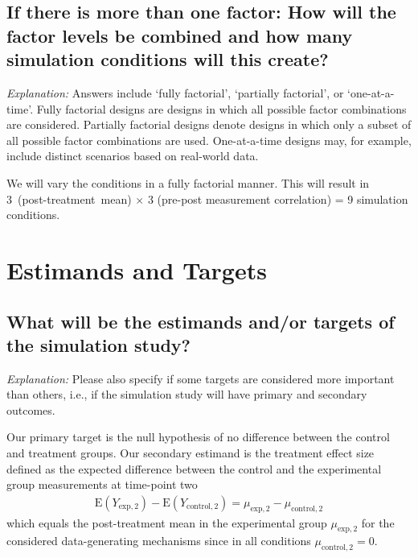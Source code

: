 \documentclass[12pt]{article}
\begin{document}
\subsection{If there is more than one factor: How will the factor levels be combined and how many simulation conditions will this create?} 
\textit{Explanation:}  Answers include `fully factorial', `partially factorial', or `one-at-a-time'. Fully factorial designs are designs in which all possible factor combinations are considered. Partially factorial designs denote designs in which only a subset of all possible factor combinations are used. One-at-a-time designs may, for example, include distinct scenarios based on real-world data. 
    
\begin{examplebox}
We will vary the conditions in a fully factorial manner. This will result in \mbox{3 (post-treatment mean)} $\times$ 3 (pre-post measurement correlation) = 9 simulation conditions.
\end{examplebox} 


\section{Estimands and Targets}
\subsection{What will be the estimands and/or targets of the simulation study?}      
\textit{Explanation:} Please also specify if some targets are considered more important than others, i.e., if the simulation study will have primary and secondary outcomes. 
    
\begin{examplebox}
Our primary target is the null hypothesis of no difference between the control and treatment groups. Our secondary estimand is the treatment effect size defined as the expected difference between the control and the experimental group measurements at time-point two
\begin{align*}
    \text{E}(Y_{\text{exp},2}) - \text{E}(Y_{\text{control},2}) = \mu_{\text{exp},2} - \mu_{\text{control},2}
\end{align*}
which equals the post-treatment mean in the experimental group $\mu_{\text{exp},2}$ for the considered data-generating mechanisms since in all conditions $\mu_{\text{control},2} = 0$. 
\end{examplebox}  
\end{document}
